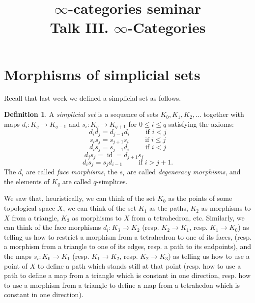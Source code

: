 \documentclass[a4paper]{amsart}
\title{$∞$-categories seminar \\
Talk III. $∞$-Categories}
\numberwithin{figure}{section}
\theoremstyle{theorem}
\theoremstyle{definition}
\newtheorem{defi}[thm]{Definition}
\DeclareMathOperator{\id}{id}
\begin{document}
\maketitle

\section{Morphisms of simplicial sets}

Recall that last week we defined a simplicial set as follows. \\

\begin{mdframed}
\begin{defi} \label{defi:SS}
A \emph{simplicial set} is a sequence of sets $K_0, K_1, K_2, \dots$ together with maps $d_i: K_q → K_{q-1}$ and $s_i: K_q → K_{q+1}$ for $0 \leq i \leq q$ satisfying the axioms:
\[ d_id_j = d_{j-1}d_i \qquad \textrm{ if } i < j \]
\[ s_is_j = s_{j+1}s_i \qquad \textrm{ if } i \leq j \]
\[ d_is_j = s_{j-1}d_i \qquad \textrm{ if } i < j \]
\[ d_js_j = \id = d_{j + 1}s_j \qquad \qquad   \] 
\[ d_is_j = s_{j}d_{i-1} \qquad \textrm{ if } i > j + 1. \]
The $d_i$ are called \emph{face morphisms}, the $s_i$ are called \emph{degeneracy morphisms}, and the elements of $K_q$ are called $q$-simplices.   
\end{defi}
\end{mdframed}

We saw that, heuristically, we can think of the set $K_0$ as the points of some topological space $X$, we can think of the set $K_1$ as the paths, $K_2$ as morphisms to $X$ from a triangle, $K_3$ as morphisms to $X$ from a tetrahedron, etc. Similarly, we can think of the face morphisms $d_i: K_3 \to K_2$ (resp. $K_2 \to K_1$, resp. $K_1 \to K_0$) as telling us how to restrict a morphism from a tetrahedron to one of its faces, (resp. a morphism from a triangle to one of its edges, resp. a path to its endpoints), and the maps $s_i: K_0 \to K_1$ (resp. $K_1 \to K_2$, resp. $K_2 \to K_3$) as telling us how to use a point of $X$ to define a path which stands still at that point (resp. how to use a path to define a map from a triangle which is constant in one direction, resp. how to use a morphism from a triangle to define a map from a tetrahedon which is constant in one direction).
\end{document}
